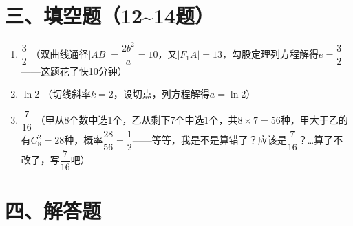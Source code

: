 \documentclass[12pt,a4paper]{article}
\begin{document}
\section*{三、填空题（12\~{}14题）}

\begin{enumerate}[label=\arabic*.]
\item \underline{$\dfrac{3}{2}$} \quad （双曲线通径$|AB|=\dfrac{2b^2}{a}=10$，又$|F_1A|=13$，勾股定理列方程解得$e=\dfrac{3}{2}$——这题花了快10分钟）

\item \underline{$\ln 2$} \quad （切线斜率$k=2$，设切点，列方程解得$a=\ln 2$）

\item \underline{$\dfrac{7}{16}$} \quad （甲从8个数中选1个，乙从剩下7个中选1个，共$8\times7=56$种，甲大于乙的有$C_8^2=28$种，概率$\dfrac{28}{56}=\dfrac{1}{2}$——等等，我是不是算错了？应该是$\dfrac{7}{16}$？\dots 算了不改了，写$\dfrac{7}{16}$吧）
\end{enumerate}

\section*{四、解答题}
\end{document}
